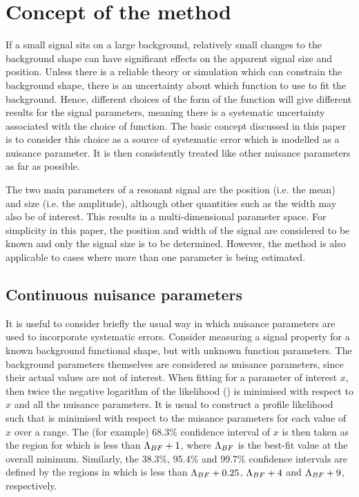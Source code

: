 \section{Concept of the method} %
\label{sec:concept}

If a small signal sits on
a large background, relatively small changes to the background shape can
have significant effects on the apparent signal size and position.
Unless there is a
reliable theory or simulation which can constrain the background shape,
there is an uncertainty about which function to use to fit
the background. Hence, different choices of the form of the function
will give different results for the signal parameters, meaning there is a
systematic uncertainty associated with the choice of function.
The basic concept discussed in this paper is to consider this choice
as a source of systematic error which is modelled as a nuisance parameter.
It is then consistently treated like other nuisance parameters as far as
possible.

The two main parameters of a resonant signal are the position (i.e. the mean)
and size (i.e. the amplitude), although other
quantities such as the width may also be of interest. This results in a
multi-dimensional parameter space. For simplicity in this paper, the position
and width of the signal are considered to be known and only the signal
size is to be determined. However, the method is also applicable to
cases where more than one parameter is being estimated.

\subsection{Continuous nuisance parameters}
\label{sec:concept:continuous}

It is useful to consider briefly the usual way in which nuisance
parameters are used to incorporate systematic errors. Consider measuring a signal
property for a known background functional shape, but with unknown function
parameters. The background parameters themselves are considered as
nuisance parameters, since their actual values are not of interest.
When fitting for a parameter of interest $x$, then twice the negative logarithm of the
likelihood (\nll) is minimised with respect to $x$ and all the
nuisance parameters. It is usual to construct a profile likelihood
such that \nll is minimised with respect to the nuisance parameters
for each value of $x$ over a range.
The (for example) 68.3\% confidence interval of $x$
is then
taken as the region for which \nll is less than ${\rm \Lambda}_{BF}+1$,
where ${\rm \Lambda}_{BF}$ is the best-fit value at the overall minimum.
Similarly, the 38.3\%, 95.4\% and 99.7\% confidence intervals are defined by the
regions in which \nll is less than ${\rm \Lambda}_{BF}+0.25$, ${\rm \Lambda}_{BF}+4$
and ${\rm \Lambda}_{BF}+9$, respectively.


